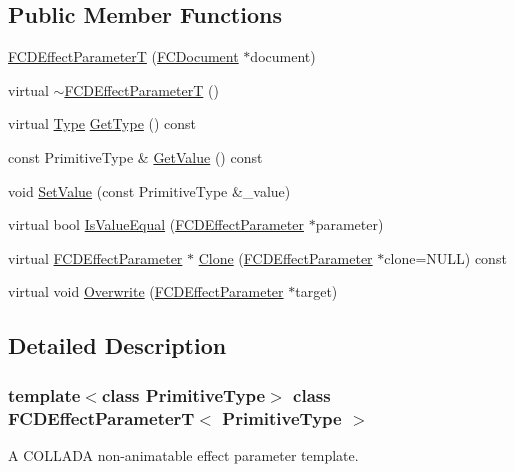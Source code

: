 \subsection*{Public Member Functions}
\begin{DoxyCompactItemize}
\item 
\hyperlink{classFCDEffectParameterT_a031c1f2f396d963d7c0b9ae7e44cf270}{FCDEffectParameterT} (\hyperlink{classFCDocument}{FCDocument} $\ast$document)
\item 
virtual \hyperlink{classFCDEffectParameterT_a12f8fd7f5c8663039d8f716bdcaa0139}{$\sim$FCDEffectParameterT} ()
\item 
virtual \hyperlink{classFCDEffectParameter_a1efe74553d2ed199435085c171743b08}{Type} \hyperlink{classFCDEffectParameterT_a8280e5d75b37d5794f33bfed92f9ad59}{GetType} () const 
\item 
const PrimitiveType \& \hyperlink{classFCDEffectParameterT_a4d0ca4343b288be2bbec5cf1c17d74c2}{GetValue} () const 
\item 
void \hyperlink{classFCDEffectParameterT_ae841e2e8c26167fa29f9a3e062db260e}{SetValue} (const PrimitiveType \&\_\-value)
\item 
virtual bool \hyperlink{classFCDEffectParameterT_a2070c18f8e6abf90ebb970d8ad249676}{IsValueEqual} (\hyperlink{classFCDEffectParameter}{FCDEffectParameter} $\ast$parameter)
\item 
virtual \hyperlink{classFCDEffectParameter}{FCDEffectParameter} $\ast$ \hyperlink{classFCDEffectParameterT_a2db377c408f4ab9fec8795aa91d3b77e}{Clone} (\hyperlink{classFCDEffectParameter}{FCDEffectParameter} $\ast$clone=NULL) const 
\item 
virtual void \hyperlink{classFCDEffectParameterT_ac65b69f100b1cab8efa1ba6c5281caf7}{Overwrite} (\hyperlink{classFCDEffectParameter}{FCDEffectParameter} $\ast$target)
\end{DoxyCompactItemize}


\subsection{Detailed Description}
\subsubsection*{template$<$class PrimitiveType$>$ class FCDEffectParameterT$<$ PrimitiveType $>$}

A COLLADA non-\/animatable effect parameter template. 

